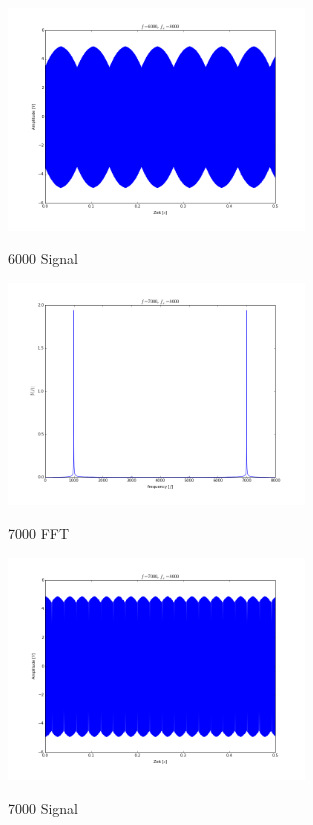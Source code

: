 \documentclass[TGAI_Laborbericht.tex]{subfiles}
\begin{document}
\begin{figure}[H]
	\includegraphics[width=0.7\textwidth]{media/6000-signal.png}
	\label{6000 Signal}
	\caption{6000 Signal}
\end{figure}

\begin{figure}[H]
	\includegraphics[width=0.7\textwidth]{media/7000-fft.png}
	\label{7000 FFT}
	\caption{7000 FFT}
\end{figure}

\begin{figure}[H]
	\includegraphics[width=0.7\textwidth]{media/7000-signal.png}
	\label{7000 Signal}
	\caption{7000 Signal}
\end{figure}
\end{document}
